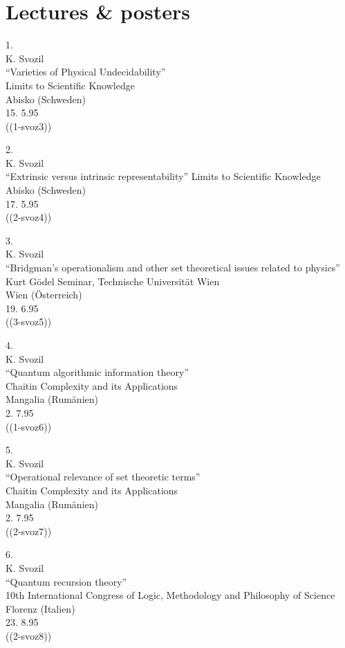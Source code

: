 \section{Lectures \& posters}






1.\\
K. Svozil\\
``Varieties of Physical Undecidability''\\
Limits to Scientific Knowledge\\
Abisko (Schweden)\\
15. 5.95\\
((1-svoz3))

2.\\
K. Svozil\\
``Extrinsic versus intrinsic representability''
Limits to Scientific Knowledge\\
Abisko (Schweden)\\
17. 5.95  \\
((2-svoz4))

3.\\
K. Svozil\\
``Bridgman's operationalism and other set theoretical issues related to
physics''\\
Kurt G\"odel Seminar, Technische Universit\"at Wien\\
Wien (\"Osterreich)\\
19. 6.95    \\
((3-svoz5))

4.\\
K. Svozil\\
``Quantum algorithmic information theory''\\
Chaitin Complexity and its Applications\\
Mangalia (Rum\"anien) \\
2. 7.95       \\
((1-svoz6))

5.\\
K. Svozil\\
``Operational relevance of set theoretic terms''     \\
Chaitin Complexity and its Applications\\
Mangalia (Rum\"anien) \\
2. 7.95         \\
((2-svoz7))


6.\\
K. Svozil\\
``Quantum recursion theory''     \\
10th International Congress of Logic, Methodology and Philosophy of
Science\\
Florenz (Italien) \\
23. 8.95          \\
((2-svoz8))



